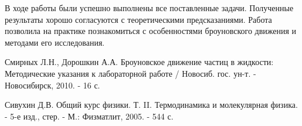 \documentclass[a4paper,14pt]{article}
\begin{document}
В ходе работы были успешно выполнены все поставленные задачи. Полученные результаты хорошо согласуются с теоретическими предсказаниями. Работа позволила на практике познакомиться с особенностями броуновского движения и методами его исследования.

\begin{thebibliography}{9}
Смирных Л.Н., Дорошкин А.А. Броуновское движение частиц в жидкости: Методические указания к лабораторной работе / Новосиб. гос. ун-т. - Новосибирск, 2010. - 16 с.

Сивухин Д.В. Общий курс физики. Т. II. Термодинамика и молекулярная физика. - 5-е изд., стер. - М.: Физматлит, 2005. - 544 с.
\end{thebibliography}
\end{document}
